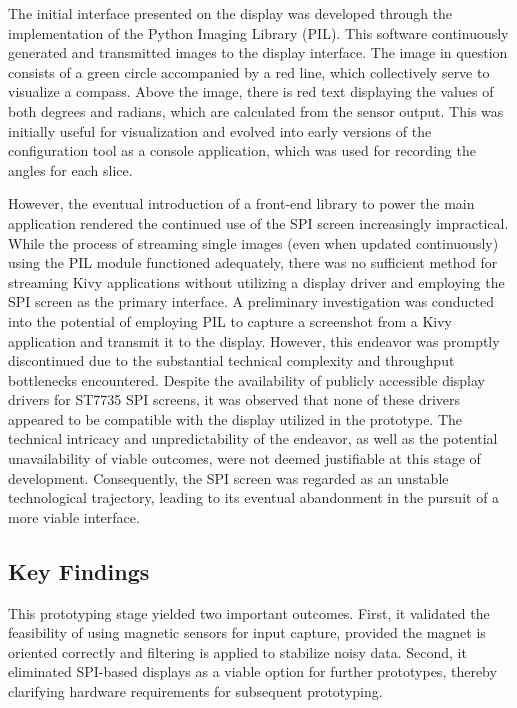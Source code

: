 	The initial interface presented on the display was developed through the implementation of the Python Imaging Library (PIL). This software continuously generated and transmitted images to the display interface. The image in question consists of a green circle accompanied by a red line, which collectively serve to visualize a compass. Above the image, there is red text displaying the values of both degrees and radians, which are calculated from the sensor output. This was initially useful for visualization and evolved into early versions of the configuration tool as a console application, which was used for recording the angles for each slice.
	
	However, the eventual introduction of a front-end library to power the main application rendered the continued use of the SPI screen increasingly impractical. While the process of streaming single images (even when updated continuously) using the PIL module functioned adequately, there was no sufficient method for streaming Kivy applications without utilizing a display driver and employing the SPI screen as the primary interface. A preliminary investigation was conducted into the potential of employing PIL to capture a screenshot from a Kivy application and transmit it to the display. However, this endeavor was promptly discontinued due to the substantial technical complexity and throughput bottlenecks encountered. Despite the availability of publicly accessible display drivers for ST7735 SPI screens, it was observed that none of these drivers appeared to be compatible with the display utilized in the prototype. The technical intricacy and unpredictability of the endeavor, as well as the potential unavailability of viable outcomes, were not deemed justifiable at this stage of development. Consequently, the SPI screen was regarded as an unstable technological trajectory, leading to its eventual abandonment in the pursuit of a more viable interface.
	
	\subsection{Key Findings}
	This prototyping stage yielded two important outcomes. First, it validated the feasibility of using magnetic sensors for input capture, provided the magnet is oriented correctly and filtering is applied to stabilize noisy data. Second, it eliminated SPI-based displays as a viable option for further prototypes, thereby clarifying hardware requirements for subsequent prototyping.


